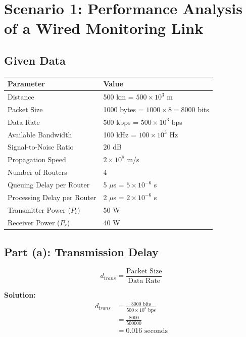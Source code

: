 \documentclass[12pt,a4paper]{article}
\begin{document}
\section{Scenario 1: Performance Analysis of a Wired Monitoring Link}

\subsection{Given Data}

\begin{table}[h]
\centering
\begin{tabular}{ll}
\toprule
\textbf{Parameter} & \textbf{Value} \\
\midrule
Distance & 500 km = $500 \times 10^3$ m \\
Packet Size & 1000 bytes = $1000 \times 8 = 8000$ bits \\
Data Rate & 500 kbps = $500 \times 10^3$ bps \\
Available Bandwidth & 100 kHz = $100 \times 10^3$ Hz \\
Signal-to-Noise Ratio & 20 dB \\
Propagation Speed & $2 \times 10^8$ m/s \\
Number of Routers & 4 \\
Queuing Delay per Router & 5 $\mu$s = $5 \times 10^{-6}$ s \\
Processing Delay per Router & 2 $\mu$s = $2 \times 10^{-6}$ s \\
Transmitter Power ($P_t$) & 50 W \\
Receiver Power ($P_r$) & 40 W \\
\bottomrule
\end{tabular}
\end{table}

\subsection{Part (a): Transmission Delay}

\begin{formulabox}
\[d_{trans} = \frac{\text{Packet Size}}{\text{Data Rate}}\]
\end{formulabox}

\textbf{Solution:}
\begin{align*}
d_{trans} &= \frac{8000 \text{ bits}}{500 \times 10^3 \text{ bps}} \\[1em]
&= \frac{8000}{500000} \\[1em]
&= 0.016 \text{ seconds}
\end{align*}
\end{document}
